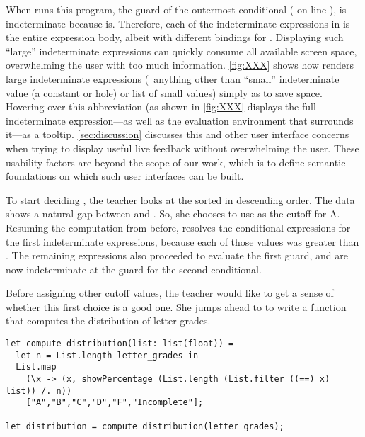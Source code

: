 \noindent
%
When \HazelnutLive{} runs this program, the guard of the outermost conditional
( on line ), is indeterminate because 
is.
%
Therefore, each of the indeterminate expressions in  is the
entire expression body, albeit with different bindings for .
%
Displaying such ``large'' indeterminate expressions can quickly consume all
available screen space, overwhelming the user with too much information.
%
\autoref{fig:XXX} shows how \HazelnutLive{} renders large indeterminate
expressions (\ie{}~anything other than ``small'' indeterminate value (a constant
or hole) or list of small values) simply as  to save space.
%
Hovering over this abbreviation (as shown in \autoref{fig:XXX} displays the full
indeterminate expression---as well as the evaluation environment that surrounds
it---as a tooltip.
%
\autoref{sec:discussion} discusses this and other user interface concerns when
trying to display useful live feedback without overwhelming the user.
%
These usability factors are beyond the scope of our work, which is to define
semantic foundations on which such user interfaces can be built.

To start deciding , the teacher looks at the 
sorted in descending order.
%
The data shows a natural gap between  and .
%
So, she chooses to use  as the cutoff for A.
%
Resuming the computation from before, \HazelnutLive{} resolves the conditional
expressions for the first  indeterminate expressions, because each of
those  values was greater than .
%
The remaining  expressions also proceeded to evaluate the first guard,
and are now indeterminate at the guard for the second conditional.

Before assigning other cutoff values, the teacher would like to get a sense of
whether this first choice is a good one.
%
She jumps ahead to to write a function that computes the distribution of letter
grades.

\begin{lstlisting}
let compute_distribution(list: list(float)) =
  let n = List.length letter_grades in
  List.map
    (\x -> (x, showPercentage (List.length (List.filter ((==) x) list)) /. n))
    ["A","B","C","D","F","Incomplete"];

let distribution = compute_distribution(letter_grades);
\end{lstlisting}

